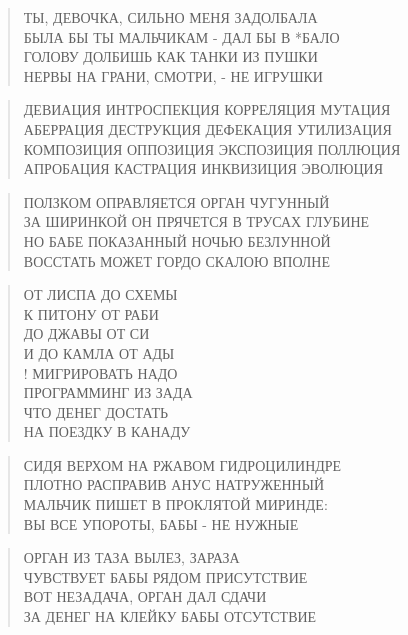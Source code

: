 \poemtitle{***}
\begin{verse}
ТЫ, ДЕВОЧКА, СИЛЬНО МЕНЯ ЗАДОЛБАЛА\\
БЫЛА БЫ ТЫ МАЛЬЧИКАМ - ДАЛ БЫ В *БАЛО\\
ГОЛОВУ ДОЛБИШЬ КАК ТАНКИ ИЗ ПУШКИ\\
НЕРВЫ НА ГРАНИ, СМОТРИ, - НЕ ИГРУШКИ
\end{verse}

\poemtitle{***}
\begin{verse}
ДЕВИАЦИЯ ИНТРОСПЕКЦИЯ КОРРЕЛЯЦИЯ МУТАЦИЯ\\
АБЕРРАЦИЯ ДЕСТРУКЦИЯ ДЕФЕКАЦИЯ УТИЛИЗАЦИЯ\\
КОМПОЗИЦИЯ ОППОЗИЦИЯ ЭКСПОЗИЦИЯ ПОЛЛЮЦИЯ\\
АПРОБАЦИЯ КАСТРАЦИЯ ИНКВИЗИЦИЯ ЭВОЛЮЦИЯ
\end{verse}

\poemtitle{***}
\begin{verse}
ПОЛЗКОМ ОПРАВЛЯЕТСЯ ОРГАН ЧУГУННЫЙ\\
ЗА ШИРИНКОЙ ОН ПРЯЧЕТСЯ В ТРУСАХ ГЛУБИНЕ\\
НО БАБЕ ПОКАЗАННЫЙ НОЧЬЮ БЕЗЛУННОЙ\\
ВОССТАТЬ МОЖЕТ ГОРДО СКАЛОЮ ВПОЛНЕ
\end{verse}

\poemtitle{***}
\begin{verse}
ОТ ЛИСПА ДО СХЕМЫ\\
К ПИТОНУ ОТ РАБИ\\
ДО ДЖАВЫ ОТ СИ\\
И ДО КАМЛА ОТ АДЫ\\!
МИГРИРОВАТЬ НАДО\\
ПРОГРАММИНГ ИЗ ЗАДА\\
ЧТО ДЕНЕГ ДОСТАТЬ\\
НА ПОЕЗДКУ В КАНАДУ
\end{verse}

\poemtitle{***}
\begin{verse}
СИДЯ ВЕРХОМ НА РЖАВОМ ГИДРОЦИЛИНДРЕ\\
ПЛОТНО РАСПРАВИВ АНУС НАТРУЖЕННЫЙ\\
МАЛЬЧИК ПИШЕТ В ПРОКЛЯТОЙ МИРИНДЕ:\\
ВЫ ВСЕ УПОРОТЫ, БАБЫ - НЕ НУЖНЫЕ
\end{verse}

\poemtitle{***}
\begin{verse}
ОРГАН ИЗ ТАЗА ВЫЛЕЗ, ЗАРАЗА\\
    ЧУВСТВУЕТ БАБЫ РЯДОМ ПРИСУТСТВИЕ\\
ВОТ НЕЗАДАЧА, ОРГАН ДАЛ СДАЧИ\\
    ЗА ДЕНЕГ НА КЛЕЙКУ БАБЫ ОТСУТСТВИЕ
\end{verse}

